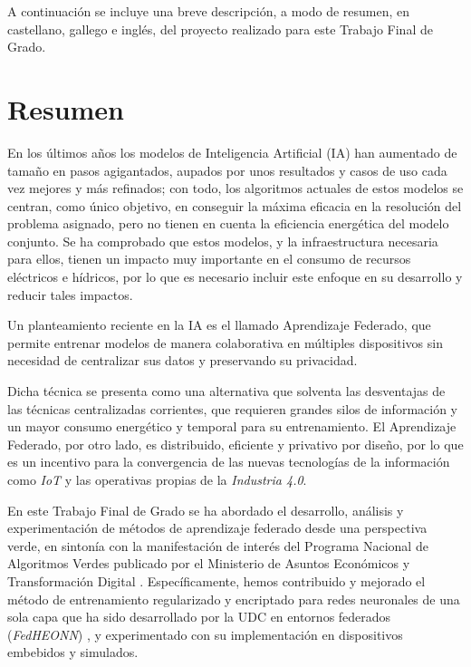 \documentclass[00-Trabajo_Final.tex]{subfiles}
\begin{document}
\renewcommand{\NombreDocumento}{Resumen}


\newpage

A continuación se incluye una breve descripción, a modo de resumen, en castellano, gallego e inglés, del proyecto realizado para este Trabajo Final de Grado.

\section{Resumen}

En los últimos años los modelos de Inteligencia Artificial (IA) han aumentado de tamaño en pasos agigantados, aupados por unos resultados y casos de uso cada vez mejores y más refinados; con todo, los algoritmos actuales de estos modelos se centran, como único objetivo, en conseguir la máxima eficacia en la resolución del problema asignado, pero no tienen en cuenta la eficiencia energética del modelo conjunto. Se ha comprobado que estos modelos, y la infraestructura necesaria para ellos, tienen un impacto muy importante en el consumo de recursos eléctricos e hídricos, por lo que es necesario incluir este enfoque en su desarrollo y reducir tales impactos.

Un planteamiento reciente en la IA es el llamado Aprendizaje Federado, que permite entrenar modelos de manera colaborativa en múltiples dispositivos sin necesidad de centralizar sus datos y preservando su privacidad. 

Dicha técnica se presenta como una alternativa que solventa las desventajas de las técnicas centralizadas corrientes, que requieren grandes silos de información y un mayor consumo energético y temporal para su entrenamiento. El Aprendizaje Federado, por otro lado, es distribuido, eficiente y privativo por diseño, por lo que es un incentivo para la convergencia de las nuevas tecnologías de la información como \textit{IoT} y las operativas propias de la \textit{Industria 4.0}.

En este Trabajo Final de Grado se ha abordado el desarrollo, análisis y experimentación de métodos de aprendizaje federado desde una perspectiva verde, en sintonía con la manifestación de interés del Programa Nacional de Algoritmos Verdes \cite{libro_PNAV} publicado por el Ministerio de Asuntos Económicos y Transformación Digital \cite{web_ministerio}. Específicamente, hemos contribuido y mejorado el método de entrenamiento regularizado y encriptado para redes neuronales de una sola capa que ha sido desarrollado por la UDC en entornos federados (\textit{FedHEONN}) \cite{paper_FEDHEONN}, y experimentado con su implementación en dispositivos embebidos y simulados.
\end{document}
